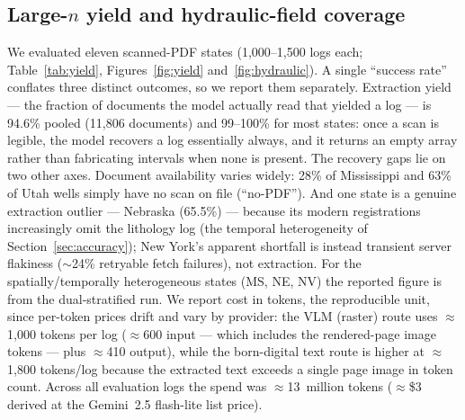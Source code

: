 \documentclass[12pt]{article}
\begin{document}
\subsection{Large-$n$ yield and hydraulic-field coverage}
\label{sec:yield}
We evaluated eleven scanned-PDF states (1{,}000--1{,}500 logs each; Table~\ref{tab:yield},
Figures~\ref{fig:yield} and~\ref{fig:hydraulic}). A single ``success rate'' conflates three distinct
outcomes, so we report them separately. Extraction yield --- the fraction of documents the model
actually read that yielded a log --- is 94.6\% pooled (11{,}806 documents) and 99--100\% for
most states: once a scan is legible, the model recovers a log essentially always, and it returns an empty
array rather than fabricating intervals when none is present. The recovery gaps lie on two other axes.
Document availability varies widely: 28\% of Mississippi and 63\% of Utah wells simply have no scan on
file (``no-PDF''). And one state is a genuine extraction outlier --- Nebraska (65.5\%) --- because
its modern registrations increasingly omit the lithology log (the temporal heterogeneity of
Section~\ref{sec:accuracy}); New York's apparent shortfall is instead transient server flakiness ($\sim$24\%
retryable fetch failures), not extraction. For the spatially/temporally heterogeneous states (MS, NE, NV) the
reported figure is from the dual-stratified run. We report cost in tokens, the reproducible unit,
since per-token prices drift and vary by provider: the VLM (raster) route uses $\approx$1{,}000 tokens per log
($\approx$600 input --- which includes the rendered-page image tokens --- plus $\approx$410 output),
while the born-digital text route is higher at $\approx$1{,}800 tokens/log because the extracted text exceeds
a single page image in token count. Across all evaluation logs the spend was $\approx$13~million tokens
($\approx$\$3 derived at the Gemini~2.5 flash-lite list price).
\end{document}
